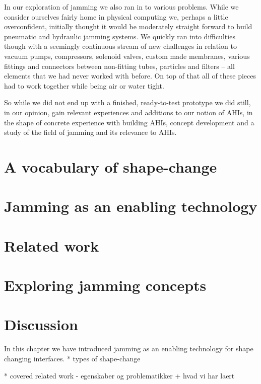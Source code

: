 In our exploration of jamming we also ran in to various problems.
While we consider ourselves fairly home in physical computing we, perhaps a little overconfident, initially thought it would be moderately straight forward to build pneumatic and hydraulic jamming systems.
We quickly ran into difficulties though with a seemingly continuous stream of new challenges in relation to vacuum pumps, compressors, solenoid valves, custom made membranes, various fittings and connectors between non-fitting tubes, particles and filters -- all elements that we had never worked with before.
On top of that all of these pieces had to work together while being air or water tight. 

So while we did not end up with a finished, ready-to-test prototype we did still, in our opinion, gain relevant experiences and additions to our notion of AHIs, in the shape of concrete experience with building AHIs, concept development and a study of the field of jamming and its relevance to AHIs. 

\section{A vocabulary of shape-change}
\label{ch:jamming:shape-change} 


\section{Jamming as an enabling technology}
\label{ch:jamming:enabling-technology} 


\section{Related work}
\label{ch:jamming:related-work} 


\section{Exploring jamming concepts}
\label{ch:jamming:concepts} 


\section{Discussion}

In this chapter we have introduced jamming as an enabling technology for shape changing interfaces.
* types of shape-change

* covered related work - egenskaber og problematikker + hvad vi har laert




